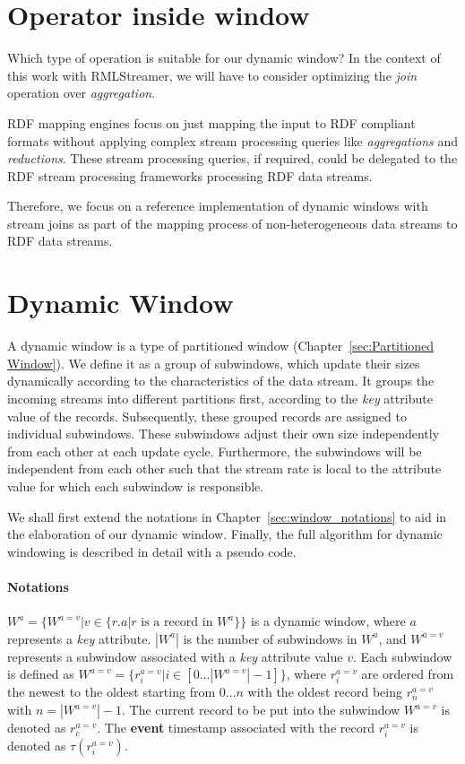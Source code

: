 \section{Operator inside window}
\label{sec:Operator inside window}
Which type of operation is suitable for our dynamic window? 
In the context of this work with RMLStreamer, we will have to consider optimizing the 
\emph{join} operation over \emph{aggregation}. 

RDF mapping engines focus 
on just mapping the input to RDF compliant formats without 
applying complex stream processing queries like \emph{aggregations} and 
\emph{reductions}. These stream processing queries, if required, could be 
delegated to the RDF stream processing frameworks processing RDF data streams.

Therefore, we focus on a reference implementation of dynamic windows with 
stream joins as part of the mapping process of non-heterogeneous data streams 
to RDF data streams. 


\section{Dynamic Window}%
\label{sec:Dynamic Window}
A dynamic window is a type of partitioned window (Chapter~\ref{sec:Partitioned Window}).
We define it as a group of subwindows, which update their sizes dynamically according to the characteristics 
of the data stream. It groups the incoming streams into different partitions first, according to 
the \emph{key} attribute value of the records. Subsequently, these grouped records are assigned 
to individual subwindows. These subwindows adjust their own size independently from each other 
at each update cycle. Furthermore, the subwindows will be independent from each other such 
that the stream rate is local to the attribute value for which each subwindow is responsible. 

We shall first extend the notations in Chapter~\ref{sec:window_notations} to aid in the 
elaboration of our dynamic window. Finally, the full algorithm for dynamic windowing 
is described in detail with a pseudo code. 


\paragraph{Notations}
$W^{a} = \{ W^{a=v} | v \in \{r.a | r \text{ is a record in } W^a\}\}$ is a dynamic window, 
where $a$ represents a \emph{key} attribute. $|W^a|$ is the number of subwindows 
in $W^a$, and $W^{a=v}$ represents a subwindow associated with a \emph{key} attribute value 
$v$. Each subwindow is defined as $W^{a=v} = \{r_{i}^{a=v} | i \in [0\dots|W^{a=v}|-1]\}$, 
where $r_{i}^{a=v}$ are ordered from the newest to the oldest starting from 
$0\dots n$ with the oldest record being $r_{n}^{a=v}$ with $n = |W^{a=v}|-1$. 
The current record to be put into the subwindow $W^{a=v}$ is denoted as $r_{c}^{a=v}$. 
The \textbf{event} timestamp associated with the record $r_{i}^{a=v}$ is denoted as 
$\tau(r_{i}^{a=v})$. 

